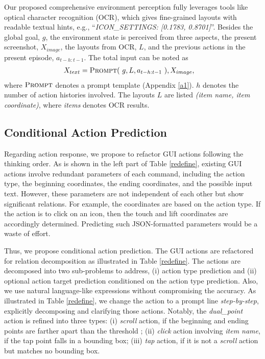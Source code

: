 Our proposed comprehensive environment perception fully leverages tools like optical character recognition (OCR), which gives fine-grained layouts with readable textual hints, e.g., ``\textit{ICON\_SETTINGS: [0.1783, 0.8701]}''.
Besides the global goal, $g$, the environment state is perceived from three aspects, the present screenshot, $X_{image}$, the layouts from OCR, $L$,  and the previous actions in the present episode, ${a_{t-h:t-1}}$. The total input can be noted as
\begin{equation}
\setlength{\abovedisplayskip}{5pt}
\setlength{\belowdisplayskip}{5pt}
\begin{split}
& {X}_{text} = \textsc{Prompt} \textup{( }g, L, {a_{t-h:t-1}} \textup{ )}, X_{image},
\end{split}
\label{input}
\end{equation}
where $\textsc{Prompt}$ denotes a prompt template (Appendix \ref{a1}). $h$ denotes the number of action histories involved. The layouts $L$ are listed \textit{(item name, item coordinate)}, where \textit{items} denotes OCR results.

\subsection{Conditional Action Prediction}
Regarding action response, we propose to refactor GUI actions following the thinking order.
As is shown in the left part of Table \ref{redefine}, existing GUI actions involve redundant parameters of each command, 
including the action type, the beginning coordinates, the ending coordinates, and the possible input text.
However, these parameters are not independent of each other but show significant relations. 
For example, the coordinates are based on the action type. If the action is to click on an icon, then the touch and lift coordinates are accordingly determined.
Predicting such JSON-formatted parameters would be a waste of effort.

Thus, we propose conditional action prediction.
The GUI actions are refactored for relation decomposition as illustrated in Table \ref{redefine}. 
The actions are decomposed into two sub-problems to address, (i) action type prediction and (ii) optional action target prediction conditioned on the action type prediction.
Also, we use natural language-like expressions without compromising the accuracy.
As illustrated in Table \ref{redefine}, we change the action to a prompt line \textit{step-by-step}, explicitly decomposing and clarifying those actions.
Notably, the \textit{dual\_point} action is refined into three types: (i) \textit{scroll} action, if the beginning and ending points are farther apart than the threshold \cite{rawles2023android}; (ii) \textit{click} action involving \textit{item name}, if the tap point falls in a bounding box; (iii) \textit{tap} action, if it is not a \textit{scroll} action but matches no bounding box.


